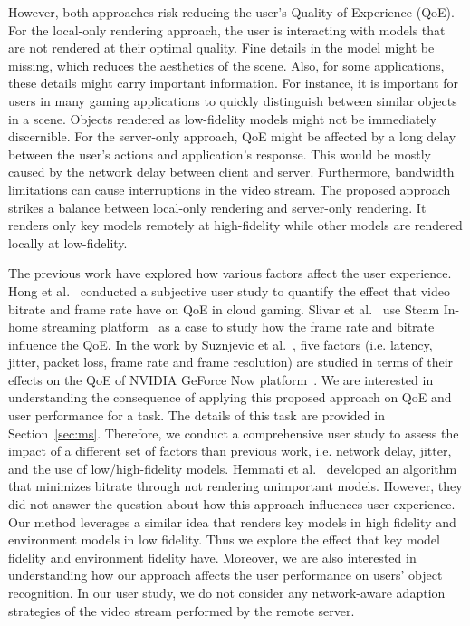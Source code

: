 However, both approaches risk reducing the user's Quality of Experience (QoE). For the local-only rendering approach, the user is interacting with models that are not rendered at their optimal quality. Fine details in the model might be missing, which reduces the aesthetics of the scene. Also, for some applications, these details might carry important information. For instance, it is important for users in many gaming applications to quickly distinguish between similar objects in a scene. Objects rendered as low-fidelity models might not be immediately discernible. For the server-only approach, QoE might be affected by a long delay between the user's actions and application's response. This would be mostly caused by the network delay between client and server. Furthermore, bandwidth limitations can cause interruptions in the video stream.
The proposed approach strikes a balance between local-only rendering and server-only rendering. It renders only key models remotely at high-fidelity while other models are rendered locally at low-fidelity. 

The previous work have explored how various factors affect the user experience. Hong et al.~\cite{hong2015user-study} conducted a subjective user study to quantify the effect that video bitrate and frame rate have on QoE in cloud gaming.
Slivar et al.~\cite{slivar2015qoe} use Steam In-home streaming platform~\cite{steam-in-home} as a case to study how the frame rate and bitrate influence the QoE.
In the work by Suznjevic et al.~\cite{suznjevic2016}, five factors (i.e. latency, jitter, packet loss, frame rate and frame resolution) are studied in terms of their effects on the QoE of NVIDIA GeForce Now platform~\cite{nvidia-geforce-now}.
We are interested in understanding the consequence of applying this proposed approach on QoE and user performance for a task. The details of this task are provided in Section~\ref{sec:ms}.
Therefore, we conduct a comprehensive user study to assess the impact of a different set of factors than previous work, i.e. network delay, jitter, and the use of low/high-fidelity models.
Hemmati et al.~\cite{hemmati2013bitrate} developed an algorithm that minimizes bitrate through not rendering unimportant models. However, they did not answer the question about how this approach influences user experience. Our method leverages a similar idea that renders key models in high fidelity and environment models in low fidelity. Thus we explore the effect that key model fidelity and environment fidelity have.
Moreover, we are also interested in understanding how our approach affects the user performance on users' object recognition.
In our user study, we do not consider any network-aware adaption strategies of the video stream performed by the remote server.  

